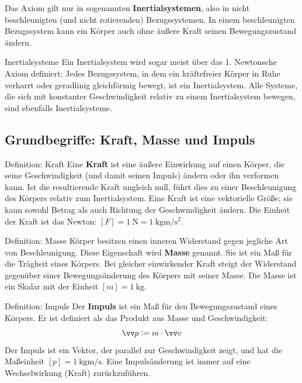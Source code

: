 Das Axiom gilt nur in sogenannten \textbf{Inertialsystemen}, also in nicht beschleunigten (und nicht rotierenden) Bezugssystemen. In einem beschleunigten Bezugssystem kann ein Körper auch ohne äußere Kraft seinen Bewegungszustand ändern. 

\begin{rememberbox}[]{Inertialsysteme}
    Ein Inertialsystem wird sogar meist über das 1. Newtonsche Axiom definiert: Jedes Bezugssystem, in dem ein kräftefreier Körper in Ruhe verharrt oder geradlinig gleichförmig bewegt, ist ein Inertialsystem. Alle Systeme, die sich mit konstanter Geschwindigkeit relativ zu einem Inertialsystem bewegen, sind ebenfalls Inertialsysteme.
\end{rememberbox}

\subsection{Grundbegriffe: Kraft, Masse und Impuls}\label{subsec: grundbegriffe_dynamik}

\begin{rememberbox}[]{Definition: Kraft}
    Eine \textbf{Kraft} ist eine äußere Einwirkung auf einen Körper, die seine Geschwindigkeit (und damit seinen Impuls) ändern oder ihn verformen kann. Ist die resultierende Kraft ungleich null, führt dies zu einer Beschleunigung des Körpers relativ zum Inertialsystem. Eine Kraft ist eine vektorielle Größe; sie kann sowohl Betrag als auch Richtung der Geschwindigkeit ändern. Die Einheit der Kraft ist das Newton: $[F] = \SI{1}{\newton} = \SI{1}{\kilogram\meter\per\second\squared}$.
\end{rememberbox}

\begin{rememberbox}[]{Definition: Masse}
    Körper besitzen einen inneren Widerstand gegen jegliche Art von Beschleunigung. Diese Eigenschaft wird \textbf{Masse} genannt. Sie ist ein Maß für die Trägheit eines Körpers. Bei gleicher einwirkender Kraft steigt der Widerstand gegenüber einer Bewegungsänderung des Körpers mit seiner Masse. Die Masse ist ein Skalar mit der Einheit $[m] = \SI{1}{\kilogram}$.
\end{rememberbox}


\begin{rememberbox}{Definition: Impuls}
    Der \textbf{Impuls} ist ein Maß für den Bewegungszustand eines Körpers. Er ist definiert als das Produkt aus Masse und Geschwindigkeit:
    \begin{equation}\label{eq: impuls}
        \ivec{p} \defeq m \cdot \ivec{v} 
    \end{equation}
    Der Impuls ist ein Vektor, der parallel zur Geschwindigkeit zeigt, und hat die Maßeinheit $[p] = \SI{1}{\kilogram\meter\per\second}$. Eine Impulsänderung ist immer auf eine Wechselwirkung (Kraft) zurückzuführen.
\end{rememberbox}


